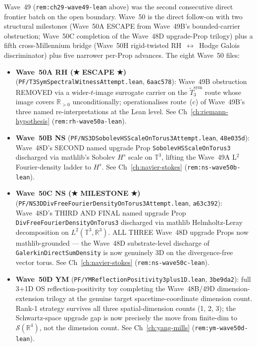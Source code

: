 \begin{remark}\label{rem:ch29-wave50-lean}
Wave~49 (\texttt{rem:ch29-wave49-lean} above) was the second consecutive direct frontier batch on the open boundary. Wave~50 is the direct follow-on with two structural milestones (Wave~50A ESCAPE from Wave~49B's bounded-carrier obstruction; Wave~50C completion of the Wave~48D upgrade-Prop trilogy) plus a fifth cross-Millennium bridge (Wave~50H rigid-twisted RH~$\leftrightarrow$~Hodge Galois discriminator) plus five narrower per-Prop advances. The eight Wave~50 files:
\begin{itemize}
  \item \textbf{Wave~50A RH (★ ESCAPE ★)} (\texttt{PF/T3SymSpectralWitnessAttempt.lean}, \texttt{6aac578}): Wave~49B obstruction REMOVED via a wider-$t$-image surrogate carrier on the $\widetilde{T}_3^{\mathrm{sym}}$ route whose image covers $\mathbb{R}_{> 0}$ unconditionally; operationalises route~(c) of Wave~49B's three named re-interpretations at the Lean level. See Ch~\ref{ch:riemann-hypothesis} (\texttt{rem:rh-wave50a-lean}).
  \item \textbf{Wave~50B NS} (\texttt{PF/NS3DSobolevHSScaleOnTorus3Attempt.lean}, \texttt{48e035d}): Wave~48D's SECOND named upgrade Prop \texttt{SobolevHSScaleOnTorus3} discharged via mathlib's Sobolev $H^s$ scale on $\mathbb{T}^3$, lifting the Wave~49A L$^2$ Fourier-density ladder to $H^s$. See Ch~\ref{ch:navier-stokes} (\texttt{rem:ns-wave50b-lean}).
  \item \textbf{Wave~50C NS (★ MILESTONE ★)} (\texttt{PF/NS3DDivFreeFourierDensityOnTorus3Attempt.lean}, \texttt{a63c392}): Wave~48D's THIRD AND FINAL named upgrade Prop \texttt{DivFreeFourierDensityOnTorus3} discharged via mathlib Helmholtz-Leray decomposition on $L^2(\mathbb{T}^3, \mathbb{R}^3)$. ALL THREE Wave~48D upgrade Props now mathlib-grounded --- the Wave~48D substrate-level discharge of \texttt{GalerkinDirectSumDensity} is now genuinely 3D on the divergence-free vector torus. See Ch~\ref{ch:navier-stokes} (\texttt{rem:ns-wave50c-lean}).
  \item \textbf{Wave~50D YM} (\texttt{PF/YMReflectionPositivity3plus1D.lean}, \texttt{3be9da2}): full 3+1D OS reflection-positivity toy completing the Wave~48B/49D dimension-extension trilogy at the genuine target spacetime-coordinate dimension count. Rank-1 strategy survives all three spatial-dimension counts (1, 2, 3); the Schwartz-space upgrade gap is now precisely the move from finite-dim to $\mathcal{S}(\mathbb{R}^4)$, not the dimension count. See Ch~\ref{ch:yang-mills} (\texttt{rem:ym-wave50d-lean}).

\end{itemize}
\end{remark}
